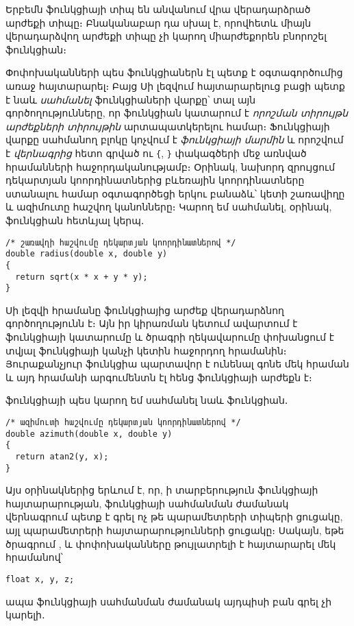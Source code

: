 Երբեմն ֆունկցիայի տիպ են անվանում վրա վերադարձրած արժեքի տիպը։
Բնականաբար դա սխալ է, որովհետև միայն վերադարձվող արժեքի տիպը չի
կարող միարժեքորեն բնորոշել ֆունկցիան։

Փոփոխականների պես ֆունկցիաներն էլ պետք է օգտագործումից առաջ հայտարարել։
Բայց Սի լեզվում հայտարարելուց բացի պետք է նաև \emph{սահմանել}
 ֆունկցիաների վարքը՝ տալ այն գործողությունները,
որ ֆունկցիան կատարում է \emph{որոշման տիրույթն} \emph{արժեքների տիրույթին}
արտապատկերելու համար։ Ֆունկցիայի վարքը սահմանող բլոկը կոչվում է
\emph{ֆունկցիայի մարմին} և որոշվում է
\emph{վերնագրից} հետո գրված ու \verb|{|, \verb|}| փակագծերի մեջ առնված
հրամանների հաջորդականությամբ։ Օրինակ, նախորդ զրույցում դեկարտյան
կոորդինատներից բևեռային կոորդինատները ստանալու համար օգտագործեցի երկու
բանաձև՝ կետի շառավիղը և ազիմուտը հաշվող կանոնները։ Կարող եմ սահմանել,
օրինակ,  ֆունկցիան հետևյալ կերպ․

\begin{Verbatim}
/* շառավղի հաշվումը դեկարտյան կոորդինատներով */
double radius(double x, double y)
{
  return sqrt(x * x + y * y);
}
\end{Verbatim}

Սի լեզվի  հրամանը ֆունկցիայից արժեք
վերադարձնող գործողությունն է։ Այն իր կիրառման կետում ավարտում է
ֆունկցիայի կատարումը և ծրագրի ղեկավարումը փոխանցում է տվյալ ֆունկցիայի
կանչի կետին հաջորդող հրամանին։ Յուրաքանչյուր ֆունկցիա պարտավոր է ունենալ
գոնե մեկ  հրաման և այդ հրամանի արգումենտն էլ հենց
ֆունկցիայի արժեքն է։

 ֆունկցիայի պես կարող եմ սահմանել նաև 
ֆունկցիան․

\begin{Verbatim}
/* ազիմուտի հաշվումը դեկարտյան կոորդինատներով */
double azimuth(double x, double y)
{
  return atan2(y, x);
}
\end{Verbatim}

Այս օրինակներից երևում է, որ, ի տարբերություն ֆունկցիայի հայտարարության,
ֆունկցիայի սահմանման ժամանակ վերնագրում պետք է գրել ոչ թե պարամետրերի տիպերի
ցուցակը, այլ պարամետրերի հայտարարությունների ցուցակը։ Սակայն, եթե ծրագրում
,  և  փոփոխականները թույլատրելի է հայտարարել
մեկ հրամանով՝

\begin{Verbatim}
float x, y, z;
\end{Verbatim}

ապա ֆունկցիայի սահմանման ժամանակ այդպիսի բան գրել չի կարելի․

